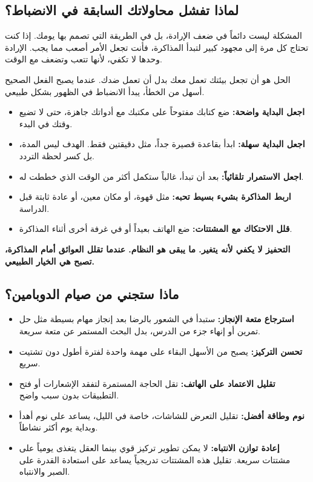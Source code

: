 \documentclass[12pt,a4paper]{book}
\newcommand{\importantAr}[1]{%
	\begin{important}
		\bfseries #1
	\end{important}
}
\begin{document}
\subsection{لماذا تفشل محاولاتك السابقة في الانضباط؟}

المشكلة ليست دائماً في ضعف الإرادة، بل في الطريقة التي تصمم بها يومك. إذا كنت تحتاج كل مرة إلى مجهود كبير لتبدأ المذاكرة، فأنت تجعل الأمر أصعب مما يجب. الإرادة وحدها لا تكفي، لأنها تتعب وتضعف مع الوقت.

الحل هو أن تجعل بيئتك تعمل معك بدل أن تعمل ضدك. عندما يصبح الفعل الصحيح أسهل من الخطأ، يبدأ الانضباط في الظهور بشكل طبيعي.

\begin{itemize}
	\item \textbf{اجعل البداية واضحة:} ضع كتابك مفتوحاً على مكتبك مع أدواتك جاهزة، حتى لا تضيع وقتك في البدء.
	
	\item \textbf{اجعل البداية سهلة:} ابدأ بقاعدة قصيرة جداً، مثل دقيقتين فقط. الهدف ليس المدة، بل كسر لحظة التردد.
	
	\item \textbf{اجعل الاستمرار تلقائياً:} بعد أن تبدأ، غالباً ستكمل أكثر من الوقت الذي خططت له.
	
	\item \textbf{اربط المذاكرة بشيء بسيط تحبه:} مثل قهوة، أو مكان معين، أو عادة ثابتة قبل الدراسة.
	
	\item \textbf{قلل الاحتكاك مع المشتتات:} ضع الهاتف بعيداً أو في غرفة أخرى أثناء المذاكرة.
\end{itemize}

\importantAr{التحفيز لا يكفي لأنه يتغير. ما يبقى هو النظام. عندما تقلل العوائق أمام المذاكرة، تصبح هي الخيار الطبيعي.}

\subsection{ماذا ستجني من صيام الدوبامين؟}

\begin{itemize}
	\item \textbf{استرجاع متعة الإنجاز:} ستبدأ في الشعور بالرضا بعد إنجاز مهام بسيطة مثل حل تمرين أو إنهاء جزء من الدرس، بدل البحث المستمر عن متعة سريعة.
	
	\item \textbf{تحسن التركيز:} يصبح من الأسهل البقاء على مهمة واحدة لفترة أطول دون تشتيت سريع.
	
	\item \textbf{تقليل الاعتماد على الهاتف:} تقل الحاجة المستمرة لتفقد الإشعارات أو فتح التطبيقات بدون سبب واضح.
	
	\item \textbf{نوم وطاقة أفضل:} تقليل التعرض للشاشات، خاصة في الليل، يساعد على نوم أهدأ وبداية يوم أكثر نشاطاً.
	
	\item \textbf{إعادة توازن الانتباه:} لا يمكن تطوير تركيز قوي بينما العقل يتغذى يومياً على مشتتات سريعة. تقليل هذه المشتتات تدريجياً يساعد على استعادة القدرة على الصبر والانتباه.
\end{itemize}
\end{document}

